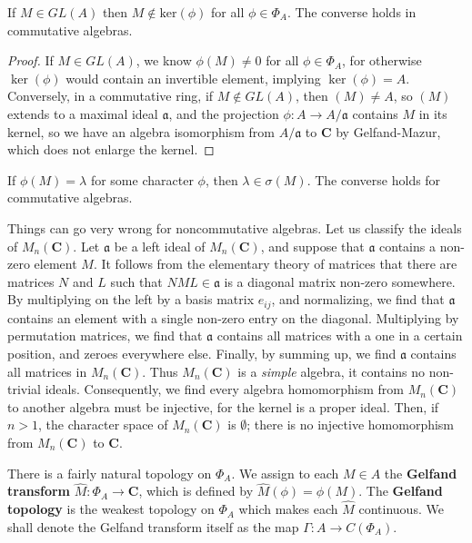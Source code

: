 \begin{lemma}
    If $M \in GL(A)$ then $M \not \in \text{ker}(\phi)$ for all $\phi \in \Phi_A$. The converse holds in commutative algebras.
\end{lemma}
\begin{proof}
    If $M \in GL(A)$, we know $\phi(M) \neq 0$ for all $\phi \in \Phi_A$, for otherwise $\ker(\phi)$ would contain an invertible element, implying $\ker(\phi) = A$. Conversely, in a commutative ring, if $M \not \in GL(A)$, then $(M) \neq A$, so $(M)$ extends to a maximal ideal $\mathfrak{a}$, and the projection $\phi: A \to A/\mathfrak{a}$ contains $M$ in its kernel, so we have an algebra isomorphism from $A/\mathfrak{a}$ to $\mathbf{C}$ by Gelfand-Mazur, which does not enlarge the kernel.
\end{proof}

\begin{corollary} \label{spectralhomomorphism}
    If $\phi(M) = \lambda$ for some character $\phi$, then $\lambda \in \sigma(M)$. The converse holds for commutative algebras.
\end{corollary}

\begin{example}
    Things can go very wrong for noncommutative algebras. Let us classify the ideals of $M_n(\mathbf{C})$. Let $\mathfrak{a}$ be a left ideal of $M_n(\mathbf{C})$, and suppose that $\mathfrak{a}$ contains a non-zero element $M$. It follows from the elementary theory of matrices that there are matrices $N$ and $L$ such that $NML \in \mathfrak{a}$ is a diagonal matrix non-zero somewhere. By multiplying on the left by a basis matrix $e_{ij}$, and normalizing, we find that $\mathfrak{a}$ contains an element with a single non-zero entry on the diagonal. Multiplying by permutation matrices, we find that $\mathfrak{a}$ contains all matrices with a one in a certain position, and zeroes everywhere else. Finally, by summing up, we find $\mathfrak{a}$ contains all matrices in $M_n(\mathbf{C})$. Thus $M_n(\mathbf{C})$ is a {\it simple} algebra, it contains no non-trivial ideals. Consequently, we find every algebra homomorphism from $M_n(\mathbf{C})$ to another algebra must be injective, for the kernel is a proper ideal. Then, if $n > 1$, the character space of $M_n(\mathbf{C})$ is $\emptyset$; there is no injective homomorphism from $M_n(\mathbf{C})$ to $\mathbf{C}$.
\end{example}

There is a fairly natural topology on $\Phi_A$. We assign to each $M \in A$ the {\bf Gelfand transform} $\widehat{M}: \Phi_A \to \mathbf{C}$, which is defined by $\widehat{M}(\phi) = \phi(M)$. The {\bf Gelfand topology} is the weakest topology on $\Phi_A$ which makes each $\widehat{M}$ continuous. We shall denote the Gelfand transform itself as the map $\Gamma: A \to C(\Phi_A)$.

